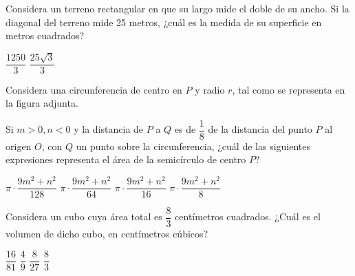 \documentclass[sin nombre]{srs}
\begin{document}
\begin{preguntas}[after-item-skip=1cm]
\pregunta Considera un terreno rectangular en que su largo mide el doble de su ancho. Si la diagonal del terreno mide 25 metros, ¿cuál es la medida de su superficie en metros cuadrados?
\begin{vertical}
\alternativa $\dfrac{1250}{3}$
\alternativa $\dfrac{25\sqrt{3}}{3}$
\end{vertical}

\pregunta Considera una circunferencia de centro en $P$ y radio $r$, tal como se representa en la figura adjunta.
\begin{centrado}
\end{centrado}
Si $m>0, n<0$ y la distancia de $P$ a $Q$ es de $\dfrac{1}{8}$ de la distancia del punto $P$ al origen $O$, con $Q$ un punto sobre la circunferencia, ¿cuál de las siguientes expresiones representa el área de la semicírculo de centro $P$?
\begin{vertical}
\alternativa $\pi \cdot \dfrac{9m^2+n^2}{128}$
\alternativa $\pi \cdot \dfrac{9m^2+n^2}{64}$
\alternativa $\pi \cdot \dfrac{9m^2+n^2}{16}$
\alternativa $\pi \cdot \dfrac{9m^2+n^2}{8}$
\end{vertical}

\pregunta Considera un cubo cuya área total es $\dfrac{8}{3}$ centímetros cuadrados. ¿Cuál es el volumen de dicho cubo, en centímetros cúbicos?
\begin{vertical}
\alternativa $\dfrac{16}{81}$
\alternativa $\dfrac{4}{9}$
\alternativa $\dfrac{8}{27}$
\alternativa $\dfrac{8}{3}$
\end{vertical}


\end{preguntas}
\end{document}
